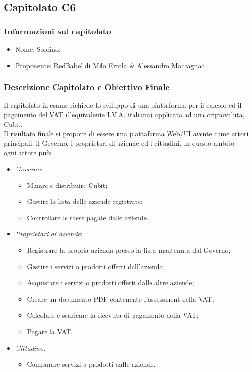 \subsection{Capitolato C6}\label{C6}

\subsubsection{Informazioni sul capitolato}
\begin{itemize}
  \item{Nome}: Soldino;
  \item{Proponente}: RedBabel di Milo Ertola \& Alessandro Maccagnan.
\end{itemize}
\subsubsection{Descrizione Capitolato e Obiettivo Finale}
Il capitolato in esame richiede lo sviluppo di una piattaforma per il calcolo ed il pagamento del VAT (l'equivalente I.V.A. italiana) applicata ad una criptovaluta, Cubit\glossario. \\
Il risultato finale si propone di essere una piattaforma Web/UI avente come attori principali: il Governo, i proprietari di aziende ed i cittadini. In questo ambito ogni attore può:
\begin{itemize}
  \item \textit{Governo}:
  \begin{itemize}
    \item Minare e distribuire Cubit;
    \item Gestire la lista delle aziende registrate;
    \item Controllare le tasse pagate dalle aziende.
  \end{itemize}
  \item \textit{Proprietari di aziende}:
  \begin{itemize}
    \item Registrare la propria azienda presso la lista mantenuta dal Governo;
    \item Gestire i servizi o prodotti offerti dall'azienda;
    \item Acquistare i servizi o prodotti offerti dalle altre aziende;
    \item Creare un documento PDF contenente l'assessment della VAT;
    \item Calcolare e scaricare la ricevuta di pagamento della VAT;
    \item Pagare la VAT.
  \end{itemize}
  \item \textit{Cittadino:}
  \begin{itemize}
    \item Comparare servizi o prodotti dalle aziende.
  \end{itemize}
\end{itemize}

